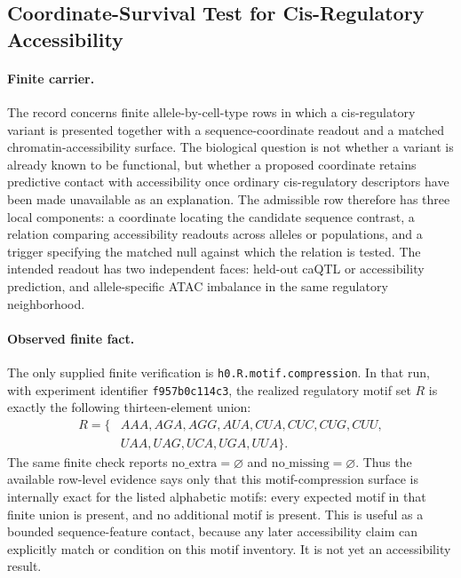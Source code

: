 \subsection{Coordinate-Survival Test for Cis-Regulatory Accessibility}
\label{subsec:cis-regulatory-coordinate-accessibility-survival-full-feature-null-cross-layer}

\paragraph{Finite carrier.}
The record concerns finite allele-by-cell-type rows in which a cis-regulatory variant is presented together with a sequence-coordinate readout and a matched chromatin-accessibility surface.  The biological question is not whether a variant is already known to be functional, but whether a proposed coordinate retains predictive contact with accessibility once ordinary cis-regulatory descriptors have been made unavailable as an explanation.  The admissible row therefore has three local components: a coordinate locating the candidate sequence contrast, a relation comparing accessibility readouts across alleles or populations, and a trigger specifying the matched null against which the relation is tested.  The intended readout has two independent faces: held-out caQTL or accessibility prediction, and allele-specific ATAC imbalance in the same regulatory neighborhood.

\paragraph{Observed finite fact.}
The only supplied finite verification is \texttt{h0.R.motif.compression}.  In that run, with experiment identifier \texttt{f957b0c114c3}, the realized regulatory motif set $R$ is exactly the following thirteen-element union:
$$
\begin{aligned}
R = \{&AAA, AGA, AGG, AUA, CUA, CUC, CUG, CUU,\\
     &UAA, UAG, UCA, UGA, UUA\}.
\end{aligned}
$$
The same finite check reports $\mathrm{no\_extra}=\varnothing$ and $\mathrm{no\_missing}=\varnothing$.  Thus the available row-level evidence says only that this motif-compression surface is internally exact for the listed alphabetic motifs: every expected motif in that finite union is present, and no additional motif is present.  This is useful as a bounded sequence-feature contact, because any later accessibility claim can explicitly match or condition on this motif inventory.  It is not yet an accessibility result.

